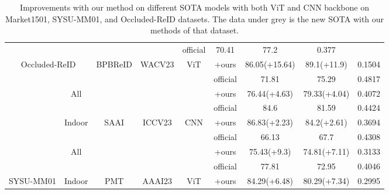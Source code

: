 \begin{table}[ht]
\begin{tabular}{cc|c|c|c|c|ccc}
$$\multicolumn{2}{c|}{} & & & & official & 70.41 & 77.2 & 0.377 \\ \cline{6-9} 
\multicolumn{2}{c|}{\multirow{-4}{*}{Occluded-ReID}} & \multirow{-2}{*}{BPBReID\cite{somers2023body}} & \multirow{-2}{*}{WACV23} & \multirow{-2}{*}{ViT} & +ours & 86.05\scriptsize{(+15.64)} & 89.1\scriptsize{(+11.9)} & 0.1504 \\ \hline
\multicolumn{1}{c|}{} & & & & & official & 71.81 & 75.29 & 0.4817 \\ \cline{6-9} 
\multicolumn{1}{c|}{} & \multirow{-2}{*}{All} & & & & \cellcolor{gray!20}+ours & \cellcolor{gray!20}76.44\scriptsize{(+4.63)} & \cellcolor{gray!20}79.33\scriptsize{(+4.04)} & \cellcolor{gray!20}0.4072 \\ \cline{2-2} \cline{6-9} 
\multicolumn{1}{c|}{} & & & & & official & 84.6 & 81.59 & 0.4424 \\ \cline{6-9} 
\multicolumn{1}{c|}{} & \multirow{-2}{*}{Indoor} & \multirow{-4}{*}{SAAI\cite{fang2023visible}} & \multirow{-4}{*}{ICCV23} & \multirow{-4}{*}{CNN} & \cellcolor{gray!20}+ours & \cellcolor{gray!20}86.83\scriptsize{(+2.23)} & \cellcolor{gray!20}84.2\scriptsize{(+2.61)} & \cellcolor{gray!20}0.3694 \\ \cline{2-9} 
\multicolumn{1}{c|}{} & & & & & official & 66.13 & 67.7 & 0.4308 \\ \cline{6-9} 
\multicolumn{1}{c|}{} & \multirow{-2}{*}{All} & & & & +ours & 75.43\scriptsize{(+9.3)} & 74.81\scriptsize{(+7.11)} & 0.3133 \\ \cline{2-2} \cline{6-9} 
\multicolumn{1}{c|}{} & & & & & official & 77.81 & 72.95 & 0.4046 \\ \cline{6-9} 
\multicolumn{1}{c|}{\multirow{-8}{*}{SYSU-MM01}} & \multirow{-2}{*}{Indoor} & \multirow{-4}{*}{PMT\cite{lu2023learning}} & \multirow{-4}{*}{AAAI23} & \multirow{-4}{*}{ViT} & +ours & 84.29\scriptsize{(+6.48)} & 80.29\scriptsize{(+7.34)} & 0.2995 \\ \hline
\end{tabular}

\caption{Improvements with our method on different SOTA models with both ViT and CNN backbone on Market1501, SYSU-MM01, and Occluded-ReID datasets. The data under \colorbox{gray!20}{grey} is the new SOTA with our methods of that dataset.}
\label{tab:sota}
\end{table}


